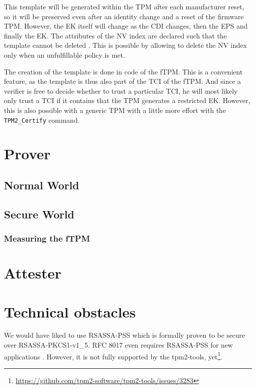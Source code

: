 This template will be generated within the TPM after each manufacturer reset, so it will be preserved even after an identity change and a reset of the firmware TPM.
However, the EK itself will change as the CDI changes, then the EPS and finally the EK.
The attributes of the NV index are declared such that the template cannot be deleted \cite{tcgPcClient}.
This is possible by allowing to delete the NV index only when an unfulfillable policy is met.

The creation of the template is done in code of the fTPM.
This is a convenient feature, as the template is thus also part of the TCI of the fTPM.
And since a verifier is free to decide whether to trust a particular TCI, he will most likely only trust a TCI if it contains that the TPM generates a restricted EK.
However, this is also possible with a generic TPM with a little more effort with the \texttt{TPM2\_Certify} command.



\section{Prover}
\subsection{Normal World}

\subsection{Secure World}

\subsubsection{Measuring the fTPM}

\section{Attester}

\section{Technical obstacles}

We would have liked to use RSASSA-PSS which is formally proven to be secure over RSASSA-PKCS1-v1\_5.
RFC 8017 even requires RSASSA-PSS for new applications  \cite{Moriarty2016}.
However, it is not fully supported by the tpm2-tools, yet\footnote{\url{https://github.com/tpm2-software/tpm2-tools/issues/3283}}.
